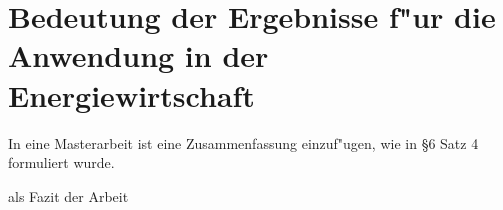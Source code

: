 \section{Bedeutung der Ergebnisse f"ur die Anwendung in der Energiewirtschaft}

In eine Masterarbeit ist eine Zusammenfassung einzuf"ugen, wie in \cite{FPOMathematik10} \S6 Satz 4 formuliert wurde.

als Fazit der Arbeit